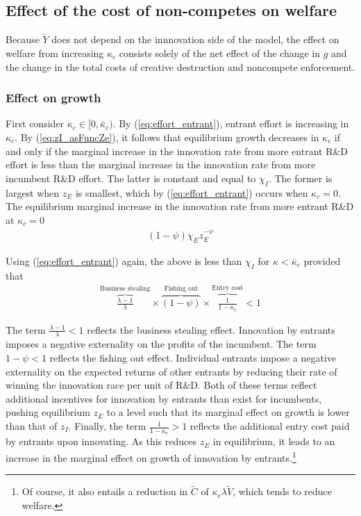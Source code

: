 \documentclass[12pt,english]{article}
\theoremstyle{remark}
\begin{document}
\subsection{Effect of the cost of non-competes on welfare}

Because $\tilde{Y}$ does not depend on the innnovation side of the model, the effect on welfare from increasing $\kappa_c$ consists solely of the net effect of the change in $g$ and the change in the total costs of creative destruction and noncompete enforcement.

\subsubsection{Effect on growth}

First consider $\kappa_c \in [0, \bar{\kappa}_c)$. By (\ref{eq:effort_entrant}), entrant effort is increasing in $\kappa_c$. By (\ref{eq:zI_asFuncZe}), it follows that equilibrium growth decreases in $\kappa_c$ if and only if the marginal increase in the innovation rate from more entrant R\&D effort is less than the marginal increase in the innovation rate from more incumbent R\&D effort. The latter is constant and equal to $\chi_I$. The former is largest when $z_E$ is smallest, which by (\ref{eq:effort_entrant}) occurs when $\kappa_c = 0$. The equilibrium marginal increase in the innovation rate from more entrant R\&D at $\kappa_c = 0$
\begin{align}
	(1-\psi) \chi_E z_E^{-\psi} 
\end{align}

Using (\ref{eq:effort_entrant}) again, the above is less than $\chi_I$ for $\kappa < \bar{\kappa}_c$ provided that
\begin{align}
	\overbrace{\frac{\lambda-1}{\lambda}}^{\textrm{Business stealing}} \times \overbrace{(1-\psi)}^{\textrm{Fishing out}} \times  \overbrace{\frac{1}{1-\kappa_{e}}}^{\textrm{Entry cost}}< 1 \label{cs:growth_decreasing_condition}
\end{align}

The term $\frac{\lambda - 1}{\lambda} < 1$ reflects the business stealing effect. Innovation by entrants imposes a negative externality on the profits of the incumbent. The term $1-\psi < 1$ reflects the fishing out effect. Individual entrants impose a negative externality on the expected returns of other entrants by reducing their rate of winning the innovation race per unit of R\&D. Both of these terms reflect additional incentives for innovation by entrants than exist for incumbents, pushing equilibrium $z_E$ to a level such that its marginal effect on growth is lower than that of $z_I$. Finally, the term $\frac{1}{1-\kappa_e} > 1$ reflects the additional entry cost paid by entrants upon innovating. As this reduces $z_E$ in equilibrium, it leads to an increase in the marginal effect on growth of innovation by entrants.\footnote{Of course, it also entails a reduction in $\tilde{C}$ of $\kappa_e \lambda \tilde{V}$, which tends to reduce welfare.}
\end{document}
